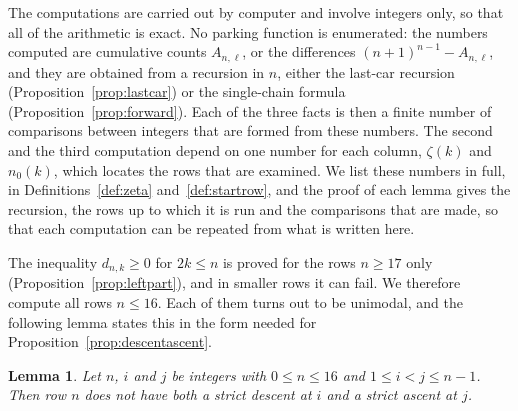 \documentclass{amsart}
\makeatletter
\newtheorem{lemma}[theorem]{Lemma}
\theoremstyle{definition}
\theoremstyle{remark}
\numberwithin{equation}{section}
\def\subsection{\@startsection{subsection}{2}\z@{.5\linespacing\@plus.7\linespacing}{-.5em}{\normalfont\bfseries\boldmath}}
\makeatother
\begin{document}
The computations are carried out by computer and involve integers only, so that all of the arithmetic is exact. No parking function is enumerated: the numbers computed are cumulative counts $A_{n,\ell}$, or the differences $(n+1)^{n-1}-A_{n,\ell}$, and they are obtained from a recursion in $n$, either the last-car recursion (Proposition~\ref{prop:lastcar}) or the single-chain formula (Proposition~\ref{prop:forward}). Each of the three facts is then a finite number of comparisons between integers that are formed from these numbers. The second and the third computation depend on one number for each column, $\zeta(k)$ and $n_0(k)$, which locates the rows that are examined. We list these numbers in full, in Definitions~\ref{def:zeta} and~\ref{def:startrow}, and the proof of each lemma gives the recursion, the rows up to which it is run and the comparisons that are made, so that each computation can be repeated from what is written here.

\subsection{Rows up to $16$}\label{subsec:tables-rows}

The inequality $d_{n,k}\ge 0$ for $2k\le n$ is proved for the rows $n\ge 17$ only (Proposition~\ref{prop:leftpart}), and in smaller rows it can fail. We therefore compute all rows $n\le 16$. Each of them turns out to be unimodal, and the following lemma states this in the form needed for Proposition~\ref{prop:descentascent}.

\begin{lemma}\label{lem:sixteenrows}
Let $n$, $i$ and $j$ be integers with $0\le n\le 16$ and $1\le i<j\le n-1$. Then row $n$ does not have both a strict descent at $i$ and a strict ascent at $j$.
\end{lemma}
\end{document}
